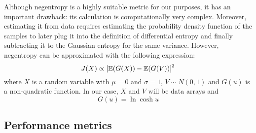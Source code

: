 Although negentropy is a highly suitable metric for our purposes, it has an important drawback: its calculation is computationally very complex. Moreover, estimating it from data requires estimating the probability density function of the samples to later plug it into the definition of differential entropy and finally subtracting it to the Gaussian entropy for the same variance. However, negentropy can be approximated with the following expression:
\begin{equation}
J(X) \propto \left[\operatorname{\mathbb{E}}(G(X)) - \operatorname{\mathbb{E}}(G(V))\right]^2
\end{equation}
where $X$ is a random variable with $\mu = 0$ and $\sigma = 1$, $V \sim N(0,1)$ and $G(u)$ is a non-quadratic function. In our case, $X$ and $V$ will be data arrays and
\begin{equation}
G(u) = \ln \cosh u
\end{equation}

\subsection{Performance metrics}
